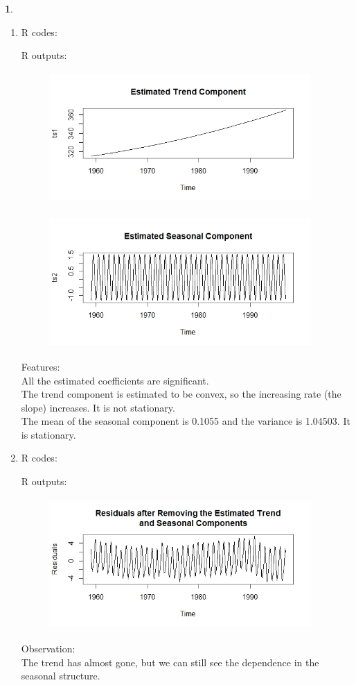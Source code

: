 \documentclass[10pt]{article}
\newtheorem{prob}{\bm{$Problem$}}
\begin{document}
\begin{prob}
\end{prob}
\begin{enumerate}[1)]
\vspace{3mm}

\item
R codes:

R outputs:

\begin{figure}[H]
  \centering
  \includegraphics[width=10cm,height=5cm]{p41a.jpeg} %
\end{figure}
\begin{figure}[H]
  \centering
  \includegraphics[width=10cm,height=5cm]{p41b.jpeg}
\end{figure}
Features:\\
All the estimated coefficients are significant.\\
The trend component is estimated to be convex, so the increasing rate (the slope) increases. It is not stationary.\\
The mean of the seasonal component is 0.1055 and the variance is 1.04503. It is stationary.\\

\item
R codes:

R outputs:
\begin{figure}[H]
  \centering
  \includegraphics[width=10cm,height=5cm]{p42a.jpeg}
\end{figure}
Observation:\\
The trend has almost gone, but we can still see the dependence in the seasonal structure.


\end{enumerate}
\end{document}
